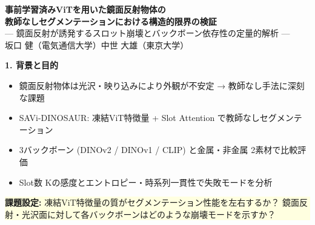 \documentclass[12pt]{jarticle}
\newcommand{\sechead}[1]{%
  \vspace{2mm}%
  \colorbox{secblue}{\parbox{\dimexpr\linewidth-2\fboxsep}{\color{white}\Huge\textbf{#1}}}%
  \vspace{2mm}%
}
\begin{document}
\enlargethispage{200mm}\fontsize{22}{30}\selectfont\noindent
%
\colorbox{titleblue}{\parbox{\linewidth}{%
  \centering\color{white}%
  \fontsize{38}{46}\selectfont\textbf{事前学習済みViTを用いた鏡面反射物体の\\[2mm]
  教師なしセグメンテーションにおける構造的限界の検証}\\[3mm]
  \fontsize{24}{32}\selectfont
  --- 鏡面反射が誘発するスロット崩壊とバックボーン依存性の定量的解析 ---\\[2mm]
  \fontsize{22}{28}\selectfont 坂口 健（電気通信大学）\quad 中世 大雄（東京大学）
}}\vspace{4mm}

\begin{minipage}[t]{0.487\linewidth}

\sechead{1. 背景と目的}
\begin{itemize}
  \item 鏡面反射物体は光沢・映り込みにより外観が不安定 → 教師なし手法に深刻な課題
  \item SAVi-DINOSAUR: 凍結ViT特徴量 + Slot Attention で教師なしセグメンテーション
  \item 3バックボーン (DINOv2 / DINOv1 / CLIP) と金属・非金属 2素材で比較評価
  \item Slot数 Kの感度とエントロピー・時系列一貫性で失敗モードを分析
\end{itemize}
\vspace{1mm}
\colorbox{lightyellow}{\parbox{\dimexpr\linewidth-2\fboxsep}{%
  \textbf{課題設定:} 凍結ViT特徴量の質がセグメンテーション性能を左右するか？
  鏡面反射・光沢面に対して各バックボーンはどのような崩壊モードを示すか？
}}\vspace{3mm}


\end{minipage}
\end{document}
